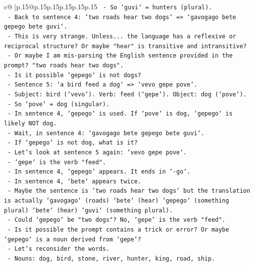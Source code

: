 \documentclass{article}
\begin{document}
{\begin{supertabular}{c@{$\;$}|p{.15\linewidth}@{}p{.15\linewidth}p{.15\linewidth}p{.15\linewidth}p{.15\linewidth}p{.15\linewidth}}
{{{\texttt{           {-} So `guvi` = hunters (plural).} \\
\texttt{         {-} Back to sentence 4: `two roads hear two dogs` => `gavogago bete gepego bete guvi`.} \\
\texttt{           {-} This is very strange. Unless... the language has a reflexive or reciprocal structure? Or maybe "hear" is transitive and intransitive?} \\
\texttt{           {-} Or maybe I am mis{-}parsing the English sentence provided in the prompt? "two roads hear two dogs".} \\
\texttt{           {-} Is it possible `gepego` is not dogs?} \\
\texttt{           {-} Sentence 5: `a bird feed a dog` => `vevo gepe pove`.} \\
\texttt{             {-} Subject: bird (`vevo`). Verb: feed (`gepe`). Object: dog (`pove`).} \\
\texttt{             {-} So `pove` = dog (singular).} \\
\texttt{             {-} In sentence 4, `gepego` is used. If `pove` is dog, `gepego` is likely NOT dog.} \\
\texttt{             {-} Wait, in sentence 4: `gavogago bete gepego bete guvi`.} \\
\texttt{             {-} If `gepego` is not dog, what is it?} \\
\texttt{             {-} Let's look at sentence 5 again: `vevo gepe pove`.} \\
\texttt{               {-} `gepe` is the verb "feed".} \\
\texttt{               {-} In sentence 4, `gepego` appears. It ends in `{-}go`.} \\
\texttt{               {-} In sentence 4, `bete` appears twice.} \\
\texttt{               {-} Maybe the sentence is `two roads hear two dogs` but the translation is actually `gavogago` (roads) `bete` (hear) `gepego` (something plural) `bete` (hear) `guvi` (something plural).} \\
\texttt{               {-} Could `gepego` be "two dogs"? No, `gepe` is the verb "feed".} \\
\texttt{               {-} Is it possible the prompt contains a trick or error? Or maybe `gepego` is a noun derived from `gepe`?} \\
\texttt{               {-} Let's reconsider the words.} \\
\texttt{               {-} Nouns: dog, bird, stone, river, hunter, king, road, ship.} \\
}}}
\end{supertabular}}
\end{document}
